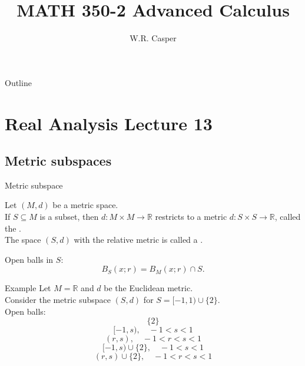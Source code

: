 \documentclass{beamer}
\title{MATH 350-2 Advanced Calculus}
\subtitle
{} %
\author[W.R. Casper] %
{W.R. Casper}
\institute[California State University Fullerton] %
{
  Department of Mathematics\\
  California State University Fullerton}
\begin{document}
\begin{frame}
  \titlepage
\end{frame}

\begin{frame}{Outline}
  \tableofcontents
\end{frame}



\section{Real Analysis Lecture 13}
\subsection{Metric subspaces}

\begin{frame}{Metric subspace}
\begin{defn}
Let $(M,d)$ be a metric space.\\
\pause
If $S\subseteq M$ is a subset, then $d: M\times M\rightarrow \mathbb{R}$ restricts to a metric $d: S\times S\rightarrow \mathbb{R}$, called the .\\
\pause
The space $(S,d)$ with the relative metric is called a .
\end{defn}
\pause
Open balls in $S$:
$$B_S(x; r) = B_M(x; r) \cap S.$$
\end{frame}

\begin{frame}{Example}
Let $M=\mathbb{R}$ and $d$ be the Euclidean metric.\\
Consider the metric subspace $(S,d)$ for $S = [-1,1)\cup \{2\}$.\\
Open balls:
$$\{2\}$$
$$[-1,s),\quad -1 < s < 1$$
$$(r,s),\quad -1 < r < s < 1$$
$$[-1,s)\cup\{2\},\quad -1 < s < 1$$
$$(r,s)\cup\{2\},\quad -1 < r < s < 1$$
\end{frame}
\end{document}
